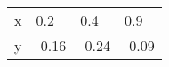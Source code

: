 \documentclass{article}
\begin{document}
\begin{table}[h!]
\begin{tabular}{llll}

\multicolumn{1}{p{30.865313pt}}{\raggedright x} & \multicolumn{1}{p{30.865313pt}}{\raggedright 0.2} & \multicolumn{1}{p{30.865313pt}}{\raggedright 0.4} & \multicolumn{1}{p{30.1125pt}}{\raggedright 0.9}\\ 

\multicolumn{1}{p{30.865313pt}}{\raggedright y} & \multicolumn{1}{p{30.865313pt}}{\raggedright -0.16} & \multicolumn{1}{p{30.865313pt}}{\raggedright -0.24} & \multicolumn{1}{p{30.1125pt}}{\raggedright -0.09}\\ 


\end{tabular}
\end{table}
\end{document}
